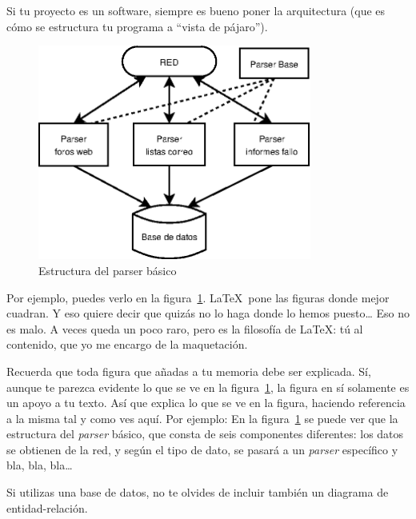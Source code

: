 \documentclass[a4paper, 12pt]{book}
\begin{document}
Si tu proyecto es un software, siempre es bueno poner la arquitectura (que es cómo se estructura tu programa a ``vista de pájaro'').

\begin{figure}
  \centering
  \includegraphics[width=9cm, keepaspectratio]{img/arquitectura.png}
  \caption{Estructura del parser básico}
  \label{fig:arquitectura}
\end{figure}


Por ejemplo, puedes verlo en la figura~\ref{fig:arquitectura}.
\LaTeX \ pone las figuras donde mejor cuadran. 
Y eso quiere decir que quizás no lo haga donde lo hemos puesto\ldots 
Eso no es malo.
A veces queda un poco raro, pero es la filosofía de \LaTeX: tú al contenido, que yo me encargo de la maquetación.


 
Recuerda que toda figura que añadas a tu memoria debe ser explicada.
Sí, aunque te parezca evidente lo que se ve en la figura~\ref{fig:arquitectura}, la figura en sí solamente es un apoyo a tu texto.
Así que explica lo que se ve en la figura, haciendo referencia a la misma tal y como ves aquí.
Por ejemplo: En la figura~\ref{fig:arquitectura} se puede ver que la estructura del \emph{parser} básico, que consta de seis componentes diferentes: los datos se obtienen de la red, y según el tipo de dato, se pasará a un \emph{parser} específico y bla, bla, bla\ldots

Si utilizas una base de datos, no te olvides de incluir también un diagrama de entidad-relación.


\end{document}
